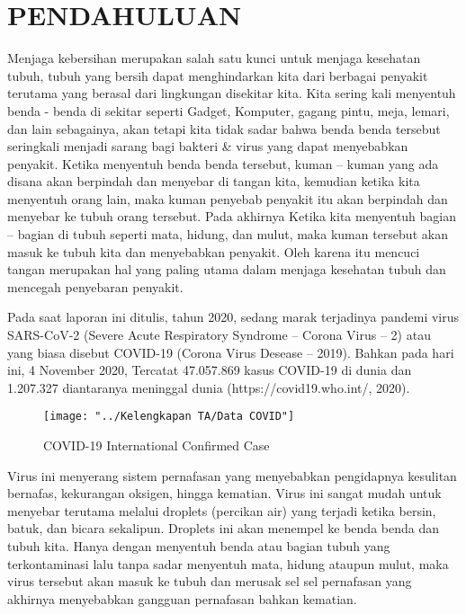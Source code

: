 \documentclass[a4paper]{article}
\begin{document}
	\section{PENDAHULUAN}
		\hspace{11mm}Menjaga kebersihan merupakan salah satu kunci untuk menjaga kesehatan tubuh, tubuh yang bersih dapat menghindarkan kita dari berbagai penyakit terutama yang berasal dari lingkungan disekitar kita. Kita sering kali menyentuh benda - benda di sekitar seperti Gadget, Komputer, gagang pintu, meja, lemari, dan lain sebagainya, akan tetapi kita tidak sadar bahwa benda benda tersebut seringkali menjadi sarang bagi bakteri \& virus yang dapat menyebabkan penyakit. Ketika menyentuh benda benda tersebut, kuman – kuman yang ada disana akan berpindah dan menyebar di tangan kita, kemudian ketika kita menyentuh orang lain, maka kuman penyebab penyakit itu akan berpindah dan menyebar ke tubuh orang tersebut. Pada akhirnya Ketika kita menyentuh bagian – bagian di tubuh seperti mata, hidung, dan mulut, maka kuman tersebut akan masuk ke tubuh kita dan menyebabkan penyakit. Oleh karena itu mencuci tangan merupakan hal yang paling utama dalam menjaga kesehatan tubuh dan mencegah penyebaran penyakit.
			
		\hspace{6mm}Pada saat laporan ini ditulis, tahun 2020, sedang marak terjadinya pandemi virus SARS-CoV-2 (Severe Acute Respiratory Syndrome – Corona Virus – 2) atau yang biasa disebut COVID-19 (Corona Virus Desease – 2019).  Bahkan pada hari ini, 4 November 2020, Tercatat 47.057.869 kasus COVID-19 di dunia dan 1.207.327 diantaranya meninggal dunia (https://covid19.who.int/, 2020).
	
		\begin{figure}[h]
			\centering
			\texttt{[image: "../Kelengkapan TA/Data COVID"]}
			\caption{COVID-19 International Confirmed Case }
			\label{fig:data-covid}
		\end{figure}

		\hspace{6mm}Virus ini menyerang sistem pernafasan yang menyebabkan pengidapnya kesulitan bernafas, kekurangan oksigen, hingga kematian. Virus ini sangat mudah untuk menyebar terutama melalui droplets (percikan air) yang terjadi ketika bersin, batuk, dan bicara sekalipun. Droplets ini akan menempel ke benda benda dan tubuh kita. Hanya dengan menyentuh benda atau bagian tubuh yang terkontaminasi lalu tanpa sadar menyentuh mata, hidung ataupun mulut, maka virus tersebut akan masuk ke tubuh dan merusak sel sel pernafasan yang akhirnya menyebabkan gangguan pernafasan bahkan kematian. 
			
\end{document}
